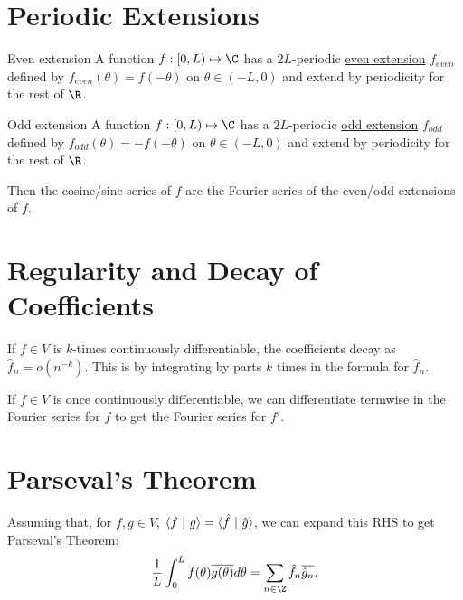 \documentclass[../Main.tex]{subfiles}
\begin{document}
\section{Periodic Extensions}
\begin{definition}{Even extension}
    A function $f : [0, L) \mapsto \C$ has a $2L$-periodic \underline{even extension} $f_{even}$ defined by $f_{even}(\theta) = f(-\theta)$ on $\theta \in (-L, 0)$ and extend by periodicity for the rest of $\R$.
\end{definition}
\begin{definition}{Odd extension}
    A function $f : [0, L) \mapsto \C$ has a $2L$-periodic \underline{odd extension} $f_{odd}$ defined by $f_{odd}(\theta) = -f(-\theta)$ on $\theta \in (-L, 0)$ and extend by periodicity for the rest of $\R$.
\end{definition}
Then the cosine/sine series of $f$ are the Fourier series of the even/odd extensions of $f$.
\section{Regularity and Decay of Coefficients}
If $f \in V$ is $k$-times continuously differentiable, the coefficients decay as $\hat{f}_n = o(n^{-k})$. This is by integrating by parts $k$ times in the formula for $\hat{f}_n$.

If $f \in V$ is once continuously differentiable, we can differentiate termwise in the Fourier series for $f$ to get the Fourier series for $f'$.
\section{Parseval's Theorem}
Assuming that, for $f, g \in V$, $\langle f~\vert~g\rangle = \langle \hat{f}~\vert~\hat{g}\rangle$, we can expand this RHS to get Parseval's Theorem:
\begin{equation*}
    \frac1L \int_{0}^{L} f(\theta)\overline{g(\theta)} d\theta = \sum_{n \in \Z} \hat{f}_n \overline{\hat{g}_n}.
\end{equation*}
\end{document}
